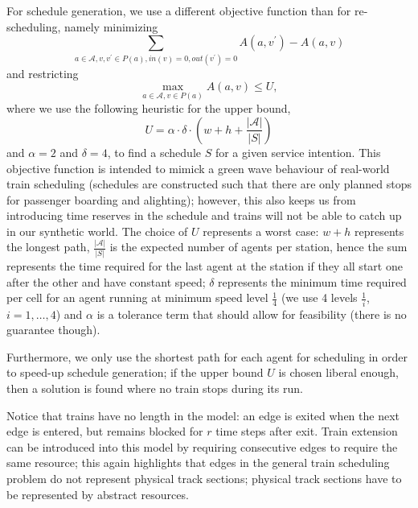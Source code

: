 \documentclass{article}
\begin{document}
For schedule generation, we use a different objective function than for re-scheduling, namely minimizing
\begin{equation}
\sum_{a \in \mathcal{A}, v,v^\prime \in P(a), in(v)=0, out(v^\prime)=0} A(a,v^\prime) - A(a,v)
\end{equation}
and restricting
\begin{equation}
\max_{a \in \mathcal{A}, v \in P(a)} A(a,v) \leq U,
\end{equation}
where we use the following heuristic for the upper bound,
\begin{equation}
U=\alpha \cdot \delta \cdot  \left(w + h + \frac{\left|\mathcal{A}\right|}{\left| S \right|} \right)
\end{equation}
and $\alpha=2$ and $\delta=4$,
to find a schedule $S$ for a given service intention. This objective function is intended to mimick a green wave behaviour of real-world train scheduling (schedules are constructed such that there are only planned stops for passenger boarding and alighting); however, this also keeps us from introducing time reserves in the schedule and trains will not be able to catch up in our synthetic world.
The choice of $U$ represents a worst case:
$w+h$ represents the longest path, $\frac{\left|\mathcal{A}\right|}{\left| S \right|}$ is the expected number of agents per station, hence the sum represents the time required for the last agent at the station if they all start one after the other and have constant speed; $\delta$ represents the minimum time required per cell for an agent running at minimum speed level $\frac{1}{4}$ (we use 4 levels $\frac{1}{i}$, $i=1,\ldots,4$) and $\alpha$ is a tolerance term that should allow for feasibility (there is no guarantee though).


Furthermore, we only use the shortest path for each agent for scheduling in order to speed-up schedule generation; if the upper bound $U$ is chosen liberal enough, then a solution is found where no train stops during its run.


Notice that trains have no length in the model: an edge is exited when the next edge is entered, but remains blocked for $r$ time steps after exit. Train extension can be introduced into this model by requiring consecutive edges to require the same resource; this again highlights that edges in the general train scheduling problem do not represent physical track sections; physical track sections have to be represented by abstract resources.
\end{document}
